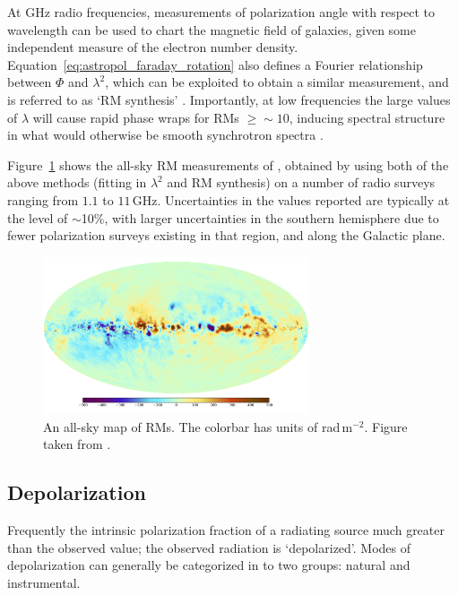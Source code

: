 At GHz radio frequencies, measurements of polarization angle with respect to wavelength can be used to chart the magnetic field of galaxies, given some independent measure of the electron number density. Equation~\ref{eq:astropol_faraday_rotation} also defines a Fourier relationship between $\Phi$ and $\lambda^2$, which can be exploited to obtain a similar measurement, and is referred to as `RM synthesis' \citep{Brentjens.05}. Importantly, at low frequencies the large values of $\lambda$ will cause rapid phase wraps for RMs $\geq \sim 10$, inducing spectral structure in what would otherwise be smooth synchrotron spectra \citep{Moore.13}. 

Figure~\ref{fig:astropol_rm_map} shows the all-sky RM measurements of \cite{Oppermann.12}, obtained by using both of the above methods (fitting in $\lambda^2$ and RM synthesis) on a number of radio surveys ranging from $1.1$ to $11$\,GHz. Uncertainties in the values reported are typically at the level of $\sim$10\%, with larger uncertainties in the southern hemisphere due to fewer polarization surveys existing in that region, and along the Galactic plane. 

\begin{figure}
\centering
\includegraphics[width=0.7\textwidth]{chapters/astropol/figures/oppermann_map.png}
\caption[An all-sky map of RMs.]{An all-sky map of RMs. The colorbar has units of rad\,m$^{-2}$. Figure taken from \cite{Oppermann.12}.}
\label{fig:astropol_rm_map}
\end{figure}

\subsection{Depolarization}
\label{subsec:astropol_depolar}

Frequently the intrinsic polarization fraction of a radiating source much greater than the observed value; the observed radiation is `depolarized'. Modes of depolarization can generally be categorized in to two groups: natural and instrumental. 


